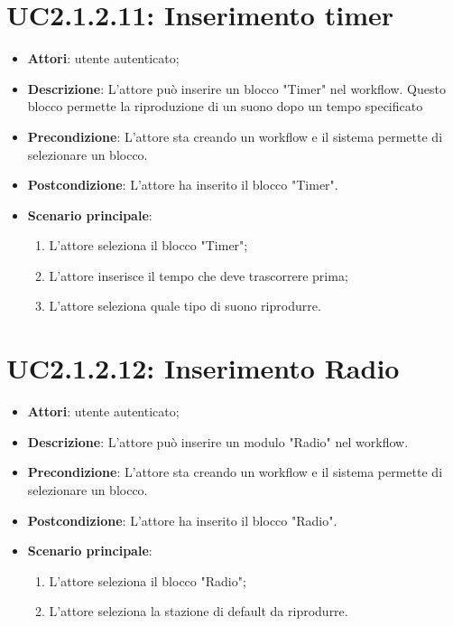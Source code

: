 \section{UC2.1.2.11: Inserimento timer}
\label{UC2.1.2.11}
\begin{itemize}
	\item \textbf{Attori}: utente autenticato;
	\item \textbf{Descrizione}: L'attore può inserire un blocco "Timer" nel workflow. Questo blocco permette la riproduzione di un suono dopo un tempo specificato
	\item \textbf{Precondizione}: L'attore sta creando un workflow e il sistema permette di selezionare un blocco.
	\item \textbf{Postcondizione}: L'attore ha inserito il blocco "Timer".
	\item \textbf{Scenario principale}:
	\begin{enumerate} \item L'attore seleziona il blocco "Timer";  \item  L'attore inserisce il tempo che deve trascorrere prima;  \item  L'attore seleziona quale tipo di suono riprodurre.\end{enumerate}
\end{itemize}

\section{UC2.1.2.12: Inserimento Radio}
\label{UC2.1.2.12}
\begin{itemize}
	\item \textbf{Attori}: utente autenticato;
	\item \textbf{Descrizione}: L'attore può inserire un modulo "Radio" nel workflow.
	\item \textbf{Precondizione}: L'attore sta creando un workflow e il sistema permette di selezionare un blocco.
	\item \textbf{Postcondizione}: L'attore ha inserito il blocco "Radio".
	\item \textbf{Scenario principale}:
	\begin{enumerate} \item L'attore seleziona il blocco "Radio";  \item  L'attore seleziona la stazione di default da riprodurre.\end{enumerate}
\end{itemize}

